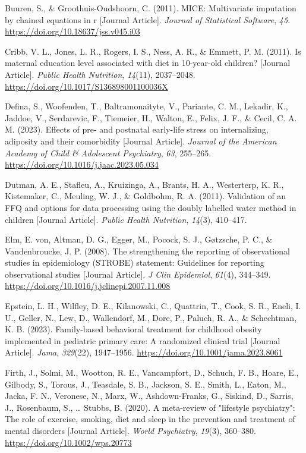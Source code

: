 \documentclass[
  letterpaper,
  DIV=11,
  numbers=noendperiod]{scrreport}
\newlength{\cslhangindent}
\newenvironment{CSLReferences}[2] %
 {\begin{list}{}{%
  \setlength{\itemindent}{0pt}
  \setlength{\leftmargin}{0pt}
  \setlength{\parsep}{0pt}
  \ifodd #1
   \setlength{\leftmargin}{\cslhangindent}
   \setlength{\itemindent}{-1\cslhangindent}
  \fi
  \setlength{\itemsep}{#2\baselineskip}}}
 {\end{list}}
\begin{document}
\begin{CSLReferences}{1}{0}
Buuren, S., \& Groothuis-Oudshoorn, C. (2011). MICE: Multivariate
imputation by chained equations in r {[}Journal Article{]}.
\emph{Journal of Statistical Software}, \emph{45}.
\url{https://doi.org/10.18637/jss.v045.i03}

Cribb, V. L., Jones, L. R., Rogers, I. S., Ness, A. R., \& Emmett, P. M.
(2011). Is maternal education level associated with diet in 10-year-old
children? {[}Journal Article{]}. \emph{Public Health Nutrition},
\emph{14}(11), 2037--2048.
\url{https://doi.org/10.1017/S136898001100036X}

Defina, S., Woofenden, T., Baltramonaityte, V., Pariante, C. M.,
Lekadir, K., Jaddoe, V., Serdarevic, F., Tiemeier, H., Walton, E.,
Felix, J. F., \& Cecil, C. A. M. (2023). Effects of pre- and postnatal
early-life stress on internalizing, adiposity and their comorbidity
{[}Journal Article{]}. \emph{Journal of the American Academy of Child \&
Adolescent Psychiatry}, \emph{63}, 255--265.
\url{https://doi.org/10.1016/j.jaac.2023.05.034}

Dutman, A. E., Stafleu, A., Kruizinga, A., Brants, H. A., Westerterp, K.
R., Kistemaker, C., Meuling, W. J., \& Goldbohm, R. A. (2011).
Validation of an FFQ and options for data processing using the doubly
labelled water method in children {[}Journal Article{]}. \emph{Public
Health Nutrition}, \emph{14}(3), 410--417.

Elm, E. von, Altman, D. G., Egger, M., Pocock, S. J., Gøtzsche, P. C.,
\& Vandenbroucke, J. P. (2008). The strengthening the reporting of
observational studies in epidemiology (STROBE) statement: Guidelines for
reporting observational studies {[}Journal Article{]}. \emph{J Clin
Epidemiol}, \emph{61}(4), 344--349.
\url{https://doi.org/10.1016/j.jclinepi.2007.11.008}

Epstein, L. H., Wilfley, D. E., Kilanowski, C., Quattrin, T., Cook, S.
R., Eneli, I. U., Geller, N., Lew, D., Wallendorf, M., Dore, P., Paluch,
R. A., \& Schechtman, K. B. (2023). Family-based behavioral treatment
for childhood obesity implemented in pediatric primary care: A
randomized clinical trial {[}Journal Article{]}. \emph{Jama},
\emph{329}(22), 1947--1956. \url{https://doi.org/10.1001/jama.2023.8061}

Firth, J., Solmi, M., Wootton, R. E., Vancampfort, D., Schuch, F. B.,
Hoare, E., Gilbody, S., Torous, J., Teasdale, S. B., Jackson, S. E.,
Smith, L., Eaton, M., Jacka, F. N., Veronese, N., Marx, W.,
Ashdown-Franks, G., Siskind, D., Sarris, J., Rosenbaum, S., \ldots{}
Stubbs, B. (2020). A meta-review of "lifestyle psychiatry": The role of
exercise, smoking, diet and sleep in the prevention and treatment of
mental disorders {[}Journal Article{]}. \emph{World Psychiatry},
\emph{19}(3), 360--380. \url{https://doi.org/10.1002/wps.20773}


\end{CSLReferences}
\end{document}
